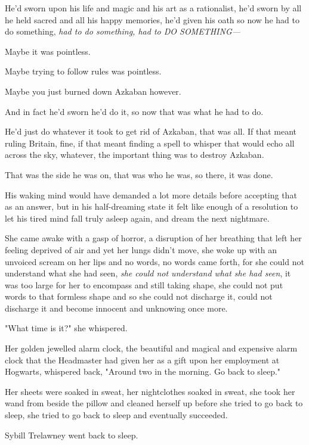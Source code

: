 He'd sworn upon his life and magic and his art as a rationalist, he'd sworn by
all he held sacred and all his happy memories, he'd given his oath so now he
had to do something, \emph{had to do something, had to DO SOMETHING—}

Maybe it was pointless.

Maybe trying to follow rules was pointless.

Maybe you just burned down Azkaban however.

And in fact he'd sworn he'd do it, so now that was what he had to do.

He'd just do whatever it took to get rid of Azkaban, that was all. If that
meant ruling Britain, fine, if that meant finding a spell to whisper that would
echo all across the sky, whatever, the important thing was to destroy Azkaban.

That was the side he was on, that was who he was, so there, it was done.

His waking mind would have demanded a lot more details before accepting that as
an answer, but in his half-dreaming state it felt like enough of a resolution
to let his tired mind fall truly asleep again, and dream the next nightmare.

She came awake with a gasp of horror, a disruption of her breathing that left
her feeling deprived of air and yet her lungs didn't move, she woke up with an
unvoiced scream on her lips and no words, no words came forth, for she could
not understand what she had seen, \emph{she could not understand what she had
seen}, it was too large for her to encompass and still taking shape, she could
not put words to that formless shape and so she could not discharge it, could
not discharge it and become innocent and unknowing once more.

"What time is it?" she whispered.

Her golden jewelled alarm clock, the beautiful and magical and expensive alarm
clock that the Headmaster had given her as a gift upon her employment at
Hogwarts, whispered back, "Around two in the morning. Go back to sleep."

Her sheets were soaked in sweat, her nightclothes soaked in sweat, she took her
wand from beside the pillow and cleaned herself up before she tried to go back
to sleep, she tried to go back to sleep and eventually succeeded.

Sybill Trelawney went back to sleep.
